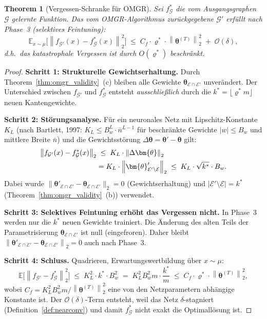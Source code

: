 \documentclass[12pt, a4paper, openany]{report}
\newtheorem{theorem}{Theorem}[chapter]
\newcommand{\E}{\mathbb{E}}
\newcommand{\calG}{\mathcal{G}}
\newcommand{\calE}{\mathcal{E}}
\newcommand{\norms}[1]{\left\|#1\right\|}
\begin{document}
\begin{theorem}[Vergessen-Schranke für OMGR]
\label{thm:omgr_forgetting}
Sei $f^*_\calG$ die vom Ausgangsgraphen $\calG$ gelernte Funktion.
Das vom OMGR-Algorithmus zurückgegebene $\calG'$ erfüllt nach
Phase~3 (selektives Feintuning):
\begin{equation}
  \label{eq:omgr_forgetting}
  \E_{x \sim \mu}\!\bigl[\norms{f_{\calG'}(x) - f^*_\calG(x)}_2^2\bigr]
  \;\leq\;
  C_f \cdot \varrho^* \cdot \norms{\bm{\theta}^{(T)}}_2^2
  \;+\; \mathcal{O}(\delta),
\end{equation}
d.h.\ das katastrophale Vergessen ist durch $O(\varrho^*)$ beschränkt.
\end{theorem}

\begin{proof}
\textbf{Schritt 1: Strukturelle Gewichtserhaltung.}
Durch Theorem~\ref{thm:omgr_validity}~(c) bleiben alle Gewichte
$\bm{\theta}_{\calE \cap \calE'}$ unverändert.  Der Unterschied zwischen
$f_{\calG'}$ und $f^*_\calG$ entsteht \emph{ausschließlich} durch die
$k^* = \lfloor\varrho^* m\rfloor$ neuen Kantengewichte.

\textbf{Schritt 2: Störungsanalyse.}
Für ein neuronales Netz mit Lipschitz-Konstante $K_L$ (nach Bartlett, 1997:
$K_L \leq B_w^L \cdot \bar{n}^{L-1}$ für beschränkte Gewichte $|w| \leq B_w$
und mittlere Breite $\bar{n}$) und die Gewichtsstörung
$\Delta\bm{\theta} = \bm{\theta}' - \bm{\theta}$ gilt:
\begin{align}
  \norms{f_{\calG'}(x) - f^*_\calG(x)}_2
  &\;\leq\; K_L \cdot \norms{\Delta\bm{\theta}}_2 \notag \\
  &= K_L \cdot \norms{\bm{\theta}'_{\calE' \setminus \calE}}_2
  \;\leq\; K_L \cdot \sqrt{k^*} \cdot B_w.
\end{align}
Dabei wurde $\|\bm{\theta}'_{\calE \cap \calE'} - \bm{\theta}_{\calE \cap \calE'}\|_2 = 0$
(Gewichtserhaltung) und $|\calE' \setminus \calE| = k^*$ (Theorem~\ref{thm:omgr_validity}~(b))
verwendet.

\textbf{Schritt 3: Selektives Feintuning erhöht das Vergessen nicht.}
In Phase~3 werden nur die $k^*$ neuen Gewichte trainiert.  Die Änderung
des alten Teils der Parametrisierung $\bm{\theta}_{\calE \cap \calE'}$
ist null (eingefroren).  Daher bleibt
$\norms{\bm{\theta}'_{\calE \cap \calE'} - \bm{\theta}_{\calE \cap \calE'}}_2 = 0$
auch nach Phase~3.

\textbf{Schritt 4: Schluss.}
Quadrieren, Erwartungswertbildung über $x \sim \mu$:
\[
  \E\!\bigl[\norms{f_{\calG'} - f^*_\calG}_2^2\bigr]
  \;\leq\; K_L^2 \cdot k^* \cdot B_w^2
  \;=\; K_L^2 B_w^2 m \cdot \frac{k^*}{m}
  \;\leq\; C_f \cdot \varrho^* \cdot \norms{\bm{\theta}^{(T)}}_2^2,
\]
wobei $C_f = K_L^2 B_w^2 m / \norms{\bm{\theta}^{(T)}}_2^2$ eine
von den Netzparametern abhängige Konstante ist.  Der $\mathcal{O}(\delta)$-Term
entsteht, weil das Netz $\delta$-stagniert
(Definition~\ref{def:nearconv}) und damit $f^*_\calG$ nicht exakt die
Optimallösung ist.
\end{proof}
\end{document}
